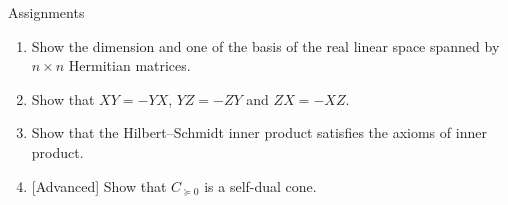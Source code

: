 \documentclass{beamer}
\theoremstyle{definition}
\begin{document}
\begin{frame}{Assignments}
\begin{enumerate}
\setlength{\itemsep}{2em}
\item Show the dimension and one of the basis of the real linear space spanned by $n\times n$ Hermitian matrices.
\item Show that $XY=-YX$, $YZ=-ZY$ and $ZX=-XZ$.
\item Show that the Hilbert--Schmidt inner product satisfies the axioms of inner product.
\item {[Advanced]} Show that $C_{\succeq 0}$ is a self-dual cone.
\end{enumerate}
\end{frame}
\end{document}
